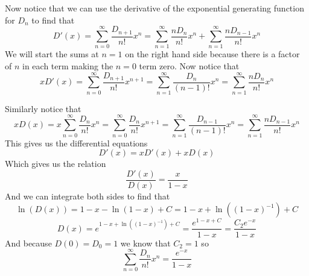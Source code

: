 \documentclass[12pt]{amsart}
\theoremstyle{definition}
\begin{document}
\begin{itemize}
Now notice that we can use the derivative of the exponential generating function for $D_n$ to find that
$$D'(x)=\sum_{n=0}^{\infty}\frac{D_{n+1}}{n!}x^n =\sum_{n=1}^{\infty}\frac{nD_{n}}{n!}x^n+\sum_{n=1}^{\infty}\frac{nD_{n-1}}{n!}x^n$$
We will start the sums at $n=1$ on the right hand side because there is a factor of $n$ in each term making the $n=0$ term zero. Now notice that 
$$xD'(x)=\sum_{n=0}^{\infty}\frac{D_{n+1}}{n!}x^{n+1}=\sum_{n=1}^{\infty}\frac{D_{n}}{(n-1)!}x^{n}=\sum_{n=1}^{\infty}\frac{nD_{n}}{n!}x^{n}$$

Similarly notice that 
$$xD(x)=x\sum_{n=0}^{\infty}\frac{D_{n}}{n!}x^{n}=\sum_{n=0}^{\infty}\frac{D_{n}}{n!}x^{n+1}=\sum_{n=1}^{\infty}\frac{D_{n-1}}{(n-1)!}x^{n}=\sum_{n=1}^{\infty}\frac{nD_{n-1}}{n!}x^{n}$$
This gives us the differential equations 
$$D'(x)=xD'(x)+xD(x)$$
Which gives us the relation
$$\frac{D'(x)}{D(x)}=\frac{x}{1-x}$$
And we can integrate both sides to find that
$$\ln(D(x))=1-x-\ln(1-x)+C=1-x+\ln((1-x)^{-1})+C$$
$$D(x)=e^{1-x+\ln((1-x)^{-1})+C}=\frac{e^{1-x+C}}{1-x}=\frac{C_2e^{-x}}{1-x}$$
And because $D(0)=D_0=1$ we know that $C_2=1$ so
$$\sum_{n=0}^{\infty} \frac{D_n}{n!}x^n=\frac{e^{-x}}{1-x}$$






\end{itemize}
\end{document}
